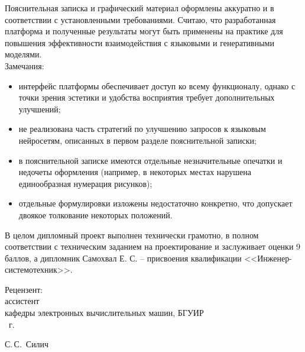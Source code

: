 \documentclass[12pt,a4paper]{article}
\begin{document}
{Пояснительная записка и графический материал оформлены аккуратно и в соответствии с установленными требованиями. Считаю, что разработанная платформа и полученные результаты могут быть применены на практике для повышения эффективности взаимодействия с языковыми и генеративными моделями.
\\Замечания:
\begin{itemize}
  \item интерфейс платформы обеспечивает доступ ко всему функционалу, однако с точки зрения эстетики и удобства восприятия требует дополнительных улучшений;
  \item не реализована часть стратегий по улучшению запросов к языковым нейросетям, описанных в первом разделе пояснительной записки;
  \item в пояснительной записке имеются отдельные незначительные опечатки и недочеты оформления (например, в некоторых местах нарушена единообразная нумерация рисунков);
  \item отдельные формулировки изложены недостаточно конкретно, что допускает двоякое толкование некоторых положений.
\end{itemize}

В целом дипломный проект выполнен технически грамотно, в полном соответствии с техническим заданием на проектирование и заслуживает оценки 9 баллов, а дипломник Самохвал Е. С. – присвоения квалификации <<Инженер-системотехник>>.

  \vfill
  \noindent
  \begin{minipage}{0.4\textwidth}
    \begin{flushleft}
      Рецензент:\\
      ассистент\\
      кафедры электронных вычислительных машин, БГУИР\\
      \underline{\hspace*{2em}} \underline{\hspace*{6.5em}} \the\year{}~г.
    \end{flushleft}
  \end{minipage}
  \begin{minipage}{0.58\textwidth}
    \begin{flushright}
    \underline{\hspace*{3cm}}\hspace*{0.5cm} С.\,С.~Силич \\
    \end{flushright}
  \end{minipage}
}

\clearpage
\end{document}
